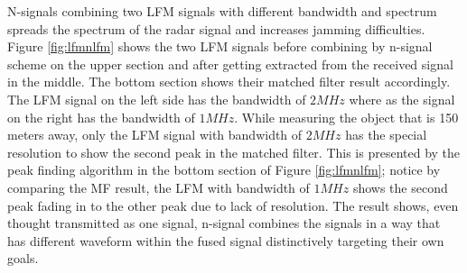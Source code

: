 \documentclass[letterpaper, 12 pt, conference]{report}
\numberwithin{figure}{section}
\begin{document}
N-signals combining two LFM signals with different bandwidth and spectrum spreads the spectrum of the radar signal and increases jamming difficulties. Figure \ref{fig:lfmnlfm} shows the two LFM signals before combining by n-signal scheme on the upper section and after getting extracted from the received signal in the middle. The bottom section shows their matched filter result accordingly. The LFM signal on the left side has the bandwidth of $2 MHz$ where as the signal on the right has the bandwidth of $1 MHz$. While measuring the object that is 150 meters away, only the LFM signal with bandwidth of $2 MHz$ has the special resolution to show the second peak in the matched filter. This is presented by the peak finding algorithm in the bottom section of Figure \ref{fig:lfmnlfm}; notice by comparing the MF result, the LFM with bandwidth of $1 MHz$ shows the second peak fading in to the other peak due to lack of resolution. The result shows, even thought transmitted as one signal, n-signal combines the signals in a way that has different waveform within the fused signal distinctively targeting their own goals.\\
\end{document}
